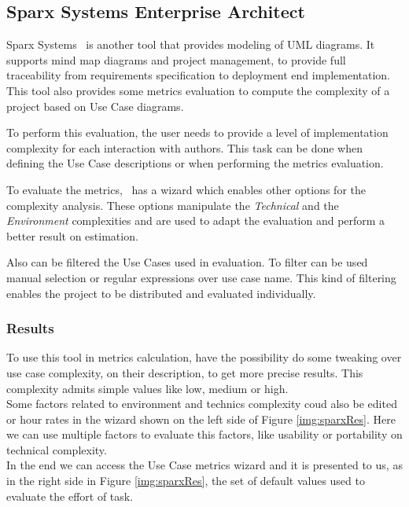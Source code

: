 \subsection{Sparx Systems Enterprise Architect}
Sparx Systems \entArch~is another tool that provides modeling of UML diagrams.
It supports mind map diagrams and project management, to provide full traceability from requirements specification to deployment end implementation.
This tool also provides some metrics evaluation to compute the complexity of a project based on Use Case diagrams. 

To perform this evaluation, the user needs to provide a level of implementation complexity for each interaction with authors. 
This task can be done when defining the Use Case descriptions or when performing the metrics evaluation.

To evaluate the metrics, \entArch~has a wizard which enables other options for the complexity analysis.
These options manipulate the \emph{Technical} and the \emph{Environment} complexities and are used to adapt the evaluation and perform a better result on estimation.

Also can be filtered the Use Cases used in evaluation. 
To filter can be used manual selection or regular expressions over use case name.
This kind of filtering enables the project to be distributed and evaluated individually.

\subsubsection{Results}
To use this tool in metrics calculation, have the possibility do some tweaking over use case complexity, on their description, to get more precise results.
This complexity admits simple values like low, medium or high.\\
Some factors related to environment and technics complexity coud also be edited or hour rates in the wizard shown on the left side of Figure \ref{img:sparxRes}.
Here we can use multiple factors to evaluate this factors, like usability or portability on technical complexity.\\
In the end we can access the Use Case metrics wizard and it is presented to us, as in the right side in Figure \ref{img:sparxRes}, the set of default
values used to evaluate the effort of task.

